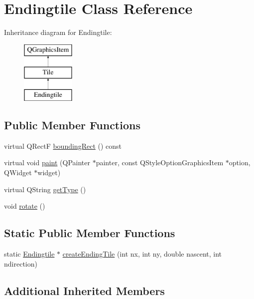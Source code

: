 \hypertarget{class_endingtile}{}\section{Endingtile Class Reference}
\label{class_endingtile}
Inheritance diagram for Endingtile\+:\begin{figure}[H]
\begin{center}
\leavevmode
\includegraphics[height=3.000000cm]{class_endingtile}
\end{center}
\end{figure}
\subsection*{Public Member Functions}
\begin{DoxyCompactItemize}
\item 
virtual Q\+RectF \mbox{\hyperlink{class_endingtile_a96035b6213a6704c781ccde3792e04d8}{bounding\+Rect}} () const
\item 
virtual void \mbox{\hyperlink{class_endingtile_accfd225f8b68494147466d98f0eb38a3}{paint}} (Q\+Painter $\ast$painter, const Q\+Style\+Option\+Graphics\+Item $\ast$option, Q\+Widget $\ast$widget)
\item 
virtual Q\+String \mbox{\hyperlink{class_endingtile_a1e3f8d51207bd2fcd295e88b5e037b03}{get\+Type}} ()
\item 
void \mbox{\hyperlink{class_endingtile_a130af5ae1efa2bf53ffe23f89fe06834}{rotate}} ()
\end{DoxyCompactItemize}
\subsection*{Static Public Member Functions}
\begin{DoxyCompactItemize}
\item 
static \mbox{\hyperlink{class_endingtile}{Endingtile}} $\ast$ \mbox{\hyperlink{class_endingtile_aebb90e09ae669f305c980e9e7420c397}{create\+Ending\+Tile}} (int nx, int ny, double nascent, int ndirection)
\end{DoxyCompactItemize}
\subsection*{Additional Inherited Members}


